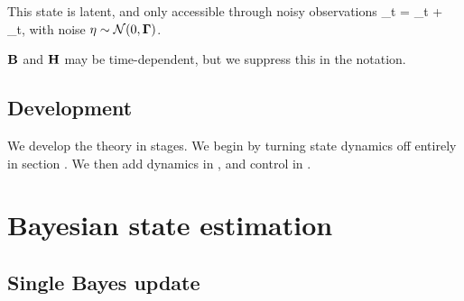 \documentclass[notitlepage,openany,11pt]{report}
\theoremstyle{plain}%
\numberwithin{equation}{section}
\begin{document}
This state is latent, and only accessible through noisy observations
\be
{}_{t} =  _t + \mbf{\eta}_{t},
\ee
with noise $\eta \sim \mathcal{N}(0, \mathbf{\Gamma})$.

$\mathbf{B}$ and $\mathbf{H}$ may be time-dependent, but we suppress this in the notation.

\subsection{Development}

We develop the theory in stages. We begin by turning state dynamics off entirely in section . We then add dynamics in \boldref{}, and control in \boldref{}.


\section{Bayesian state estimation}
\label{sec-bayesian-state-estimation}

\subsection{Single Bayes update}
\end{document}
